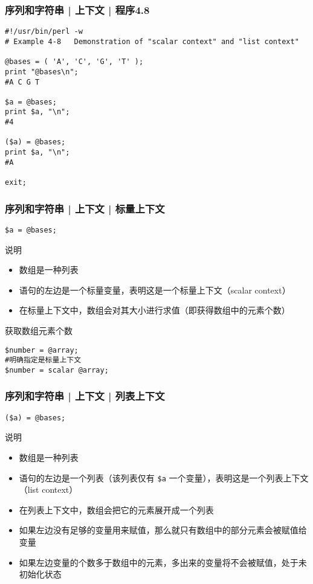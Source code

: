 \begin{frame}[fragile]
  \frametitle{序列和字符串 | 上下文 | \alert{程序4.8}}
\begin{lstlisting}[basicstyle=\small\tt]
#!/usr/bin/perl -w
# Example 4-8   Demonstration of "scalar context" and "list context"

@bases = ( 'A', 'C', 'G', 'T' );
print "@bases\n";
#A C G T

$a = @bases;
print $a, "\n";
#4

($a) = @bases;
print $a, "\n";
#A

exit;
\end{lstlisting}
\end{frame}

\begin{frame}[fragile]
  \frametitle{序列和字符串 | 上下文 | \alert{标量上下文}}
\begin{lstlisting}
$a = @bases;
\end{lstlisting}
\pause
\begin{block}{说明}
  \begin{itemize}
    \item 数组是一种列表
    \item 语句的左边是一个标量变量，表明这是一个标量上下文（scalar context）
    \item 在标量上下文中，数组会对其大小进行求值（即获得数组中的元素个数）
  \end{itemize}
\end{block}
\pause
\begin{block}{获取数组元素个数}
\begin{lstlisting}
$number = @array;
#明确指定是标量上下文
$number = scalar @array;
\end{lstlisting}
\end{block}
\end{frame}

\begin{frame}[fragile]
  \frametitle{序列和字符串 | 上下文 | \alert{列表上下文}}
\begin{lstlisting}
($a) = @bases;
\end{lstlisting}
\pause
\begin{block}{说明}
  \begin{itemize}
    \item 数组是一种列表
    \item 语句的左边是一个列表（该列表仅有 \verb|$a| 一个变量），表明这是一个列表上下文（list context）
    \item 在列表上下文中，数组会把它的元素展开成一个列表
    \item 如果左边没有足够的变量用来赋值，那么就只有数组中的部分元素会被赋值给变量
    \item 如果左边变量的个数多于数组中的元素，多出来的变量将不会被赋值，处于未初始化状态
  \end{itemize}
\end{block}
\end{frame}

